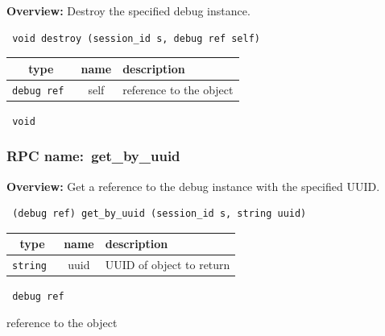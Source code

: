 {\bf Overview:} 
Destroy the specified debug instance.

\begin{verbatim} void destroy (session_id s, debug ref self)\end{verbatim}



 
\vspace{0.3cm}
\begin{tabular}{|c|c|p{7cm}|}
 \hline
{\bf type} & {\bf name} & {\bf description} \\ \hline
{\tt debug ref } & self & reference to the object \\ \hline 

\end{tabular}

\vspace{0.3cm}

{\tt 
void
}



\vspace{0.3cm}
\vspace{0.3cm}
\vspace{0.3cm}
\subsubsection{RPC name:~get\_by\_uuid}

{\bf Overview:} 
Get a reference to the debug instance with the specified UUID.

\begin{verbatim} (debug ref) get_by_uuid (session_id s, string uuid)\end{verbatim}



 
\vspace{0.3cm}
\begin{tabular}{|c|c|p{7cm}|}
 \hline
{\bf type} & {\bf name} & {\bf description} \\ \hline
{\tt string } & uuid & UUID of object to return \\ \hline 

\end{tabular}

\vspace{0.3cm}

{\tt 
debug ref
}


reference to the object
\vspace{0.3cm}
\vspace{0.3cm}
\vspace{0.3cm}
